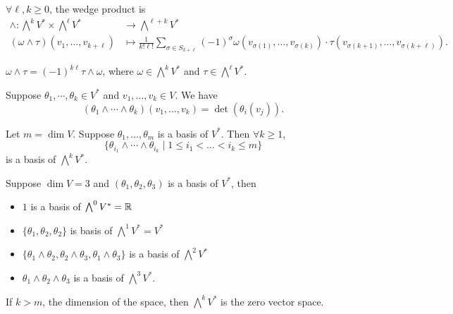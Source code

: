 \begin{definition}
    $\forall  \ell, k \ge  0$, the wedge product is
    \begin{align*}
        \wedge: \bigwedge^{k} V^{*} \times \bigwedge^{\ell} V^{*} &\longrightarrow \bigwedge^{\ell + k}V^{*}\\
        (\omega \wedge \tau)(v_1, \ldots, v_{k+\ell})&\longmapsto \frac{1}{k! \ell!}\sum_{\sigma \in S_{k + \ell}} (-1)^{\sigma} \omega(v_{\sigma(1)}, \ldots, v_{\sigma(k)})  \cdot \tau(v_{\sigma(k+1)}, \ldots, v_{\sigma(k+\ell)})
    .\end{align*}
\end{definition}


\begin{remark}
    $\omega \wedge \tau = (-1)^{k \ell} \tau \wedge \omega$, where $\omega\in \bigwedge^{k} V^{*}$ and $\tau \in \bigwedge^{\ell} V^{*}$.
\end{remark}

\begin{lemma}
    Suppose $\theta_1 ,\cdots , \theta_k \in  V^{*}$ and $v_1, \ldots, v_k \in V$. We have
    \[
        (\theta_1 \wedge \cdots \wedge \theta_k)(v_1, \ldots, v_k) = \det(\theta_i(v_j))
    .\] 
\end{lemma}

\begin{lemma}
    Let $m = \dim V$.
    Suppose  $\theta_1, \ldots, \theta_m$ is a basis of $V^{*}$. Then $\forall  k \ge  1$,
    \[
    \{\theta_{i_1} \wedge \cdots \wedge \theta_{i_k}  \mid 1 \le   i_1 <  \ldots <  i_k \le  m\} 
    \]
    is a basis of  $\bigwedge^{k} V^{*}$.
\end{lemma}
\begin{eg}
    Suppose $\dim V = 3$ and  $(\theta_1, \theta_2, \theta_3)$ is a basis of $V^{*}$, then 
    \begin{itemize}
        \item $1$ is a basis of $\bigwedge^{0} V^{*} = \mathbb{R}$
        \item $\{\theta_1, \theta_2, \theta_2\}$ is basis of $\bigwedge^{1} V^{*} = V^{*}$ 
    \item $\{\theta_1 \wedge \theta_2, \theta_2 \wedge \theta_3, \theta_1 \wedge \theta_3 \}$ is a basis of $\bigwedge ^2 V^{*}$
    \item $\theta_1 \wedge \theta_2 \wedge \theta_3$ is a basis of $\bigwedge ^{3} V^{*}$.
    \end{itemize}
\end{eg}
\begin{remark}
    If $k > m$, the dimension of the space, then $\bigwedge^{k} V^{*}$ is the zero vector space.
\end{remark}

